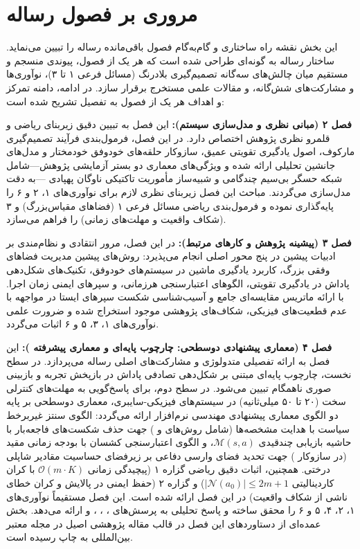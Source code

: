 \documentclass[oneside,openany,phd]{TMU-Thesis}
\begin{document}
\newpage
\section{مروری بر فصول رساله}
\label{sec:thesis_overview}

این بخش نقشه راه ساختاری و گام‌به‌گام فصول باقی‌مانده رساله را تبیین می‌نماید. ساختار رساله به گونه‌ای طراحی شده است که هر یک از فصول، پیوندی منسجم و مستقیم میان چالش‌های سه‌گانه تصمیم‌گیری بلادرنگ (مسائل فرعی ۱ تا ۳)، نوآوری‌ها و مشارکت‌های شش‌گانه، و مقالات علمی مستخرج برقرار سازد. در ادامه، دامنه تمرکز و اهداف هر یک از فصول به تفصیل تشریح شده است:

\textbf{فصل ۲ (مبانی نظری و مدل‌سازی سیستم):} این فصل به تبیین دقیق زیربنای ریاضی و قلمرو نظری پژوهش اختصاص دارد. در این فصل، فرمول‌بندی فرآیند تصمیم‌گیری مارکوف، اصول یادگیری تقویتی عمیق، سازوکار حلقه‌های خودوفق خودمختار  و مدل‌های جانشین تحلیلی ارائه شده و ویژگی‌های معماری دو بستر آزمایشی پژوهش—شامل شبکه حسگر بی‌سیم چندگامی  و شبیه‌ساز مأموریت تاکتیکی ناوگان پهپادی —به دقت مدل‌سازی می‌گردند. مباحث این فصل زیربنای نظری لازم برای نوآوری‌های ۱، ۲ و ۶ را پایه‌گذاری نموده و فرمول‌بندی ریاضی مسائل فرعی ۱ (فضاهای مقیاس‌بزرگ) و ۳ (شکاف واقعیت و مهلت‌های زمانی) را فراهم می‌سازد.

\textbf{فصل ۳ (پیشینه پژوهش و کارهای مرتبط):} در این فصل، مرور انتقادی و نظام‌مندی بر ادبیات پیشین در پنج محور اصلی انجام می‌پذیرد: روش‌های پیشین مدیریت فضاهای وفقی بزرگ، کاربرد یادگیری ماشین در سیستم‌های خودوفق، تکنیک‌های شکل‌دهی پاداش در یادگیری تقویتی، الگوهای اعتبارسنجی هرزمانی، و سپرهای ایمنی زمان اجرا. با ارائه ماتریس مقایسه‌ای جامع و آسیب‌شناسی شکست سپرهای ایستا در مواجهه با عدم قطعیت‌های فیزیکی، شکاف‌های پژوهشی موجود استخراج شده و ضرورت علمی نوآوری‌های ۱، ۳، ۵ و ۶ اثبات می‌گردد.

\textbf{فصل ۴ (معماری پیشنهادی دوسطحی: چارچوب پایه‌ای  و معماری پیشرفته \rsdrlplus):} این فصل به ارائه تفصیلی متدولوژی و مشارکت‌های اصلی رساله می‌پردازد. در سطح نخست، چارچوب پایه‌ای  مبتنی بر شکل‌دهی تصادفی پاداش در بازپخش تجربه و بازبینی صوری ناهمگام  تبیین می‌شود. در سطح دوم، برای پاسخ‌گویی به مهلت‌های کنترلی سخت (۲۰ تا ۵۰ میلی‌ثانیه) در سیستم‌های فیزیکی-سایبری، معماری دوسطحی \rsdrlplus بر پایه دو الگوی معماری پیشنهادی مهندسی نرم‌افزار ارائه می‌گردد: الگوی سنتز غیربرخط سیاست با هدایت مشخصه‌ها (\sgos شامل روش‌های \mursdrl و \cmrsdrl) جهت حذف شکست‌های فاجعه‌بار با حاشیه بازیابی چندقیدی $\mathcal{M}(s, a)$، و الگوی اعتبارسنجی کشسان با بودجه زمانی مقید (\caepv در سازوکار \pgalr) جهت تحدید فضای وارسی دفاعی بر زیرفضای حساسیت مقادیر شاپلی درختی. همچنین، اثبات دقیق ریاضی گزاره ۱ (پیچیدگی زمانی $\mathcal{O}(m \cdot K)$ با کران کاردینالیتی $|\mathcal{N}(a_0)| \le 2m + 1$) و گزاره ۲ (حفظ ایمنی در پالایش و کران خطای ناشی از شکاف واقعیت) در این فصل ارائه شده است. این فصل مستقیماً نوآوری‌های ۱، ۲، ۴، ۵ و ۶ را محقق ساخته و پاسخ تحلیلی به پرسش‌های ، ، ،  و  ارائه می‌دهد. بخش عمده‌ای از دستاوردهای این فصل در قالب مقاله پژوهشی اصیل در مجله معتبر بین‌المللی  \cite{kavianifar2026rsdrl} به چاپ رسیده است.
\end{document}
